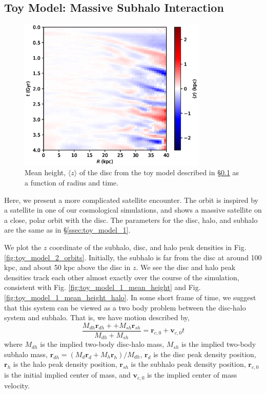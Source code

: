 \subsection{Toy Model: Massive Subhalo Interaction} \label{ssec:toy_model_2}
\begin{figure}
	\centering
	\includegraphics[width=0.8\textwidth]{../figures/b_late_light_subhalo_z_0_r_a.eps}
	\caption{Mean height, $\langle z \rangle$ of the disc from the toy model described in \S\ref{ssec:toy_model_2} as a function of radius and time.} \label{fig:toy_model_2_mean_height}
\end{figure}


Here, we present a more complicated satellite encounter. The orbit is inspired by a satellite in one of our cosmological simulations, and shows a massive satellite on a close, polar orbit with the disc. The parameters for the disc, halo, and subhalo are the same as in \S\ref{ssec:toy_model_1}.



We plot the $z$ coordinate of the subhalo, disc, and halo peak densities in Fig. \ref{fig:toy_model_2_orbits}.
Initially, the subhalo is far from the disc at around 100 kpc, and about 50 kpc above the disc in $z$. We see the disc and halo peak densities track each other almost exactly over the course of the simulation, consistent with Fig. \ref{fig:toy_model_1_mean_height} and Fig. \ref{fig:toy_model_1_mean_height_halo}. In some short frame of time, we suggest that this system can be viewed as a two body problem between the disc-halo system and subhalo. That is, we have motion described by,
\begin{equation}
\frac{M_{dh}\textbf{r}_{dh} +  + M_{sh} \textbf{r}_{sh}}{M_{dh} + M_{sh}} = \textbf{r}_{c,0} + \textbf{v}_{c,0} t
\end{equation}
where $M_{dh}$ is the implied two-body disc-halo mass, $M_{sh}$ is the implied two-body subhalo mass, $\textbf{r}_{dh} = (M_d \textbf{r}_d + M_h \textbf{r}_h)/M_{dh}$, $\textbf{r}_d$ is the disc peak density position, $\textbf{r}_h$ is the halo peak density position, $\textbf{r}_{sh}$ is the subhalo peak density position, $\textbf{r}_{c,0}$ is the initial implied center of mass, and $\textbf{v}_{c,0}$ is the implied center of mass velocity.

